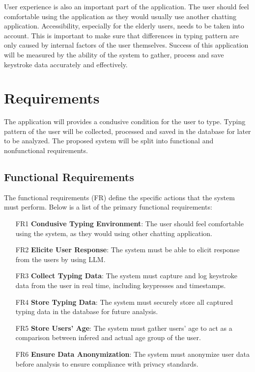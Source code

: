 User experience is also an important part of the application.
The user should feel comfortable using the application as they would usually use another chatting application.
Accessibility, especially for the elderly users, needs to be taken into account.
This is important to make sure that differences in typing pattern are only caused by internal factors of the user themselves.
Success of this application will be measured by the ability of the system to gather, process and save keystroke data accurately and effectively.

\section{Requirements}


The application will provides a condusive condition for the user to type.
Typing pattern of the user will be collected, processed and saved in the database for later to be analyzed.
The proposed system will be split into functional and nonfunctional requirements.

\subsection{Functional Requirements}


The functional requirements (FR) define the specific actions that the system must perform. 
Below is a list of the primary functional requirements:

\begin{itemize} 
    \item [FR1] \textbf{Condusive Typing Environment}: The user should feel comfortable using the system, as they would using other chatting application.
    \item [FR2] \textbf{Elicite User Response}: The system must be able to elicit response from the users by using \ac{LLM}. 
    \item [FR3] \textbf{Collect Typing Data}: The system must capture and log keystroke data from the user in real time, including keypresses and timestamps. 
    \item [FR4] \textbf{Store Typing Data}: The system must securely store all captured typing data in the database for future analysis. 
    \item [FR5] \textbf{Store Users' Age}: The system must gather users' age to act as a comparison between infered and actual age group of the user. 
    \item [FR6] \textbf{Ensure Data Anonymization}: The system must anonymize user data before analysis to ensure compliance with privacy standards. 
\end{itemize}

